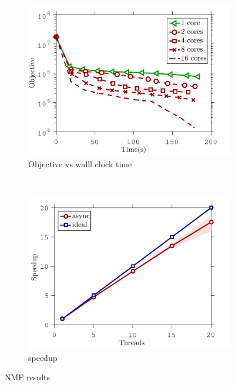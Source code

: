 \begin{figure}[!h]
        \centering
       \begin{subfigure}[b]{0.4\textwidth}
                \includegraphics[width=\textwidth]{./figs/NMF_plot}
                \caption{Objective vs walll clock time}
        \end{subfigure}
        ~~
        \begin{subfigure}[b]{0.4\textwidth}
                \includegraphics[width=\textwidth]{./figs/speedup}
                \caption{speedup}
        \end{subfigure}
        \caption{NMF results}\label{fig:NMF_speedup}
\end{figure}


